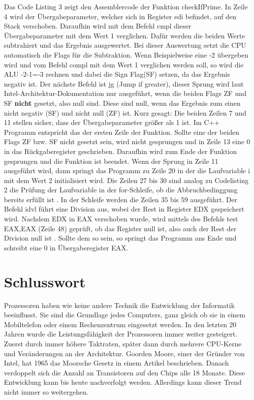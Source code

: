 \documentclass[a4paper,12pt]{article}
\begin{document}
\noindent Das Code Listing 3 zeigt den Assemblercode der Funktion checkIfPrime. In Zeile 4 wird der Übergabeparameter, welcher sich in Register edi befindet, auf den Stack verschoben. Daraufhin wird mit dem Befehl cmpl dieser Übergabeparameter mit dem Wert 1 verglichen. Dafür werden die beiden Werte subtrahiert und das Ergebnis ausgewertet. Bei dieser Auswertung setzt die CPU automatisch die Flags für die Subtraktion. Wenn Beispielweise eine -2 übergeben wird und vom Befehl compl mit dem Wert 1 verglichen werden soll, so wird die ALU -2-1=-3 rechnen und dabei die Sign Flag(SF) setzen, da das Ergebnis negativ ist. Der nächste Befehl ist jg (Jump if greater), dieser Sprung wird laut Intel-Architektur-Dokumentation nur ausgeführt, wenn die beiden Flags ZF und SF \textbf{nicht} gesetzt, also null sind. Diese sind null, wenn das Ergebnis zum einen nicht negativ (SF) und nicht null (ZF) ist. \newline Kurz gesagt: Die beiden Zeilen 7 und 11 stellen sicher, dass der Übergabeparameter größer als 1 ist. Im C++ Programm entspricht das der ersten Zeile der Funktion. Sollte eine der beiden Flags ZF bzw. SF nicht gesetzt sein, wird nicht gesprungen und in Zeile 13 eine 0 in das Rückgaberegister geschrieben. Daraufhin wird zum Ende der Funktion gesprungen und die Funktion ist beendet. Wenn der Sprung in Zeile 11 ausgeführt wird, dann springt das Programm zu Zeile 20 in der die Laufvariable i  mit dem Wert 2 initialisiert wird. Die Zeilen 27 bis 30 sind analog zu Codelisting 2 die Prüfung der Laufvariable in der for-Schleife, ob die Abbruchbedinggung bereits erfüllt ist \cite{c}. In der Schleife werden die Zeilen 35 bis 59 ausgeführt. Der Befehl idvl führt eine Division aus, wobei der Rest in Register EDX gespeichert wird. Nachdem EDX in EAX verschoben wurde, wird mittels des Befehls test EAX,EAX (Zeile 48) geprüft, ob das Register null ist, also auch der Rest der Division null ist \cite{elements2005}. Sollte dem so sein, so springt das Programm ans Ende und schreibt eine 0 in Übergaberegister EAX\cite[S.202]{technischeInformatik2}.
\newpage

\section{Schlusswort}
Prozessoren haben wie keine andere Technik die Entwicklung der Informatik beeinflusst. Sie sind die Grundlage jedes Computers, ganz gleich ob sie in einem Mobiltelefon oder einem Rechenzentrum eingesetzt werden. In den letzten 20 Jahren wurde die Leistungsfähigkeit der Prozessoren immer weiter gesteigert. Zuerst durch immer höhere Taktraten, später dann durch mehrere CPU-Kerne und Veränderungen an der Architektur. Goorden Moore, einer der Gründer von Intel, hat 1965 das Moorsche Gesetz in einem Artikel beschrieben. Danach verdoppelt sich die Anzahl an Transistoren auf den Chips alle 18 Monate. Diese Entwicklung kann bis heute nachverfolgt werden. Allerdings kann dieser Trend nicht immer so weitergehen. 
\end{document}
